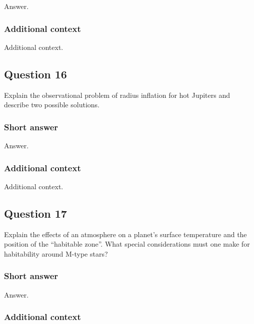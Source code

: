 \documentclass[a4paper,10pt]{article}
\begin{document}
Answer.

\subsubsection{Additional context}

Additional context.


\newpage
\subsection{Question 16}

Explain the observational problem of radius inflation for hot Jupiters and describe two possible solutions.

\subsubsection{Short answer}

Answer.

\subsubsection{Additional context}

Additional context.


\newpage
\subsection{Question 17}

Explain the effects of an atmosphere on a planet’s surface temperature and the position of the “habitable zone”. What special considerations must one make for habitability around M-type stars?

\subsubsection{Short answer}

Answer.

\subsubsection{Additional context}
\end{document}
